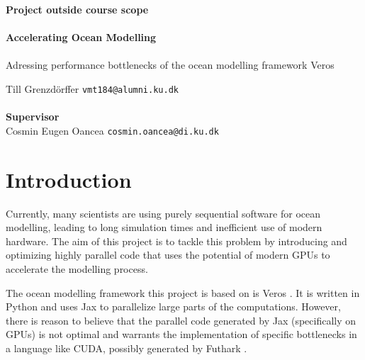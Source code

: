 \documentclass[a4paper,oneside]{memoir}
\begin{document}
    \thispagestyle{empty}
    \begin{adjustwidth}{-3cm}{-1.5cm}
    \vspace*{-1cm}
    \textbf{\Huge Project outside course scope} \\
    \vspace*{2.5cm} \\
    \textbf{\Huge Accelerating Ocean Modelling} \\
    \vspace*{.1cm} \\
    {\huge Adressing performance bottlenecks of the ocean modelling framework Veros} \\
    \begin{tabbing}
    Till Grenzdörffer \hspace{1cm} \= \texttt{vmt184@alumni.ku.dk} \\
    \\[12cm]
    \textbf{\Large Supervisor} \\
    Cosmin Eugen Oancea \> \texttt{cosmin.oancea@di.ku.dk} \\
    \end{tabbing}
    \end{adjustwidth}
    \newpage
    \ClearWallPaper



\section{Introduction}
Currently, many scientists are using purely sequential software for ocean modelling, leading to long simulation times and inefficient use of modern hardware. 
The aim of this project is to tackle this problem by introducing and optimizing highly parallel code that uses the potential of modern GPUs to accelerate the modelling process.

The ocean modelling framework this project is based on is Veros \cite{veros}. It is written in Python and uses Jax \cite{jax2018github} to parallelize large parts of the computations.
However, there is reason to believe that the parallel code generated by Jax (specifically on GPUs) is not optimal and warrants the implementation of specific bottlenecks in a language like CUDA, possibly generated by Futhark \cite{futhark}.
\end{document}
